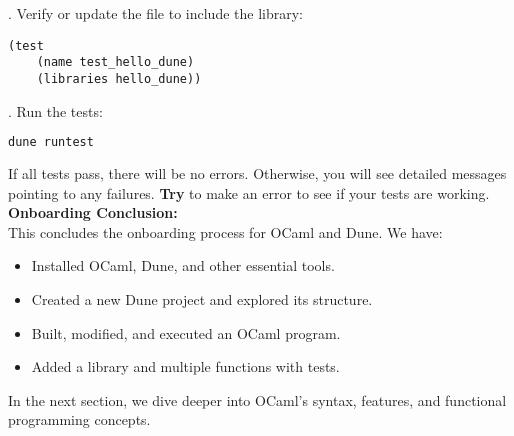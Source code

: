 
. Verify or update the  file to include the library:
   \begin{lstlisting}[language=PlainText, caption={Test Dune File}]
   (test
    (name test_hello_dune)
    (libraries hello_dune))
   \end{lstlisting}

. Run the tests:
   \begin{lstlisting}[language=Bash]
   dune runtest
   \end{lstlisting}

   \noindent If all tests pass, there will be no errors. Otherwise, you will see detailed messages
   pointing to any failures. \textbf{Try} to make an error to see if your tests are working.\\

\noindent
\textbf{Onboarding Conclusion:}\\

\vspace{-.5em}
\noindent
This concludes the onboarding process for OCaml and Dune. We have:
\begin{itemize}
    \item Installed OCaml, Dune, and other essential tools.
    \item Created a new Dune project and explored its structure.
    \item Built, modified, and executed an OCaml program.
    \item Added a library and multiple functions with tests.
\end{itemize}

\noindent
In the next section, we dive deeper into OCaml's syntax, features, and functional programming concepts.
